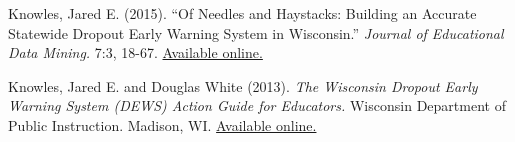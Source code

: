 \documentclass[margin,line]{res}
\begin{document}
\begin{resume}
Knowles, Jared E. (2015). ``Of Needles and Haystacks: Building an Accurate Statewide 
Dropout Early Warning System in Wisconsin.'' \emph{Journal of Educational Data 
Mining.} 7:3, 18-67. 
\href{http://www.educationaldatamining.org/JEDM/index.php/JEDM/article/view/JEDM082}{Available online.}
% 
% 
% 
% 

Knowles, Jared E. and Douglas White (2013). \emph{The Wisconsin Dropout Early 
Warning System (DEWS) Action Guide for Educators.} Wisconsin Department of Public 
Instruction. Madison, WI. \href{http://dpi.wi.gov/dews}{Available online.}



% 
% 
% 


\end{resume}
\end{document}
